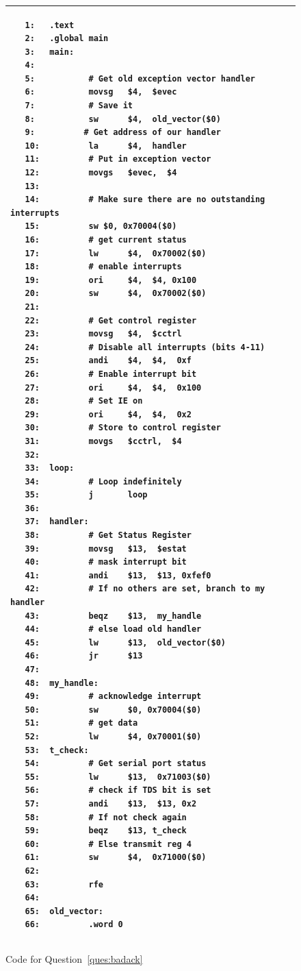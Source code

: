 \documentclass[a4paper,10pt]{article}
\begin{document}
\begin{enumerate}
\begin{figure}[p]
\begin{footnotesize}
\begin{center}
\begin{tabular}{|p{12cm}|}
\hline
\begin{verbatim}
   1:   .text
   2:   .global main
   3:   main:
   4:   
   5:           # Get old exception vector handler
   6:           movsg   $4,  $evec
   7:           # Save it
   8:           sw      $4,  old_vector($0)
   9:          # Get address of our handler
   10:          la      $4,  handler
   11:          # Put in exception vector
   12:          movgs   $evec,  $4
   13:  
   14:          # Make sure there are no outstanding interrupts
   15:          sw $0, 0x70004($0)
   16:          # get current status
   17:          lw      $4,  0x70002($0)
   18:          # enable interrupts
   19:          ori     $4,  $4, 0x100
   20:          sw      $4,  0x70002($0)
   21:  
   22:          # Get control register
   23:          movsg   $4,  $cctrl
   24:          # Disable all interrupts (bits 4-11)
   25:          andi    $4,  $4,  0xf
   26:          # Enable interrupt bit
   27:          ori     $4,  $4,  0x100
   28:          # Set IE on
   29:          ori     $4,  $4,  0x2
   30:          # Store to control register
   31:          movgs   $cctrl,  $4
   32:  
   33:  loop:
   34:          # Loop indefinitely
   35:          j       loop
   36:  
   37:  handler:
   38:          # Get Status Register
   39:          movsg   $13,  $estat
   40:          # mask interrupt bit
   41:          andi    $13,  $13, 0xfef0
   42:          # If no others are set, branch to my handler
   43:          beqz    $13,  my_handle
   44:          # else load old handler
   45:          lw      $13,  old_vector($0)
   46:          jr      $13
   47:  
   48:  my_handle:
   49:          # acknowledge interrupt
   50:          sw      $0, 0x70004($0)
   51:          # get data
   52:          lw      $4, 0x70001($0)
   53:  t_check:
   54:          # Get serial port status
   55:          lw      $13,  0x71003($0)
   56:          # check if TDS bit is set
   57:          andi    $13,  $13, 0x2
   58:          # If not check again
   59:          beqz    $13, t_check
   60:          # Else transmit reg 4
   61:          sw      $4,  0x71000($0)
   62:  
   63:          rfe
   64:  
   65:  old_vector:
   66:          .word 0

\end{verbatim}
\\ \hline
\end{tabular}
\end{center}
\end{footnotesize}
\caption{Code for Question~\ref{ques:badack}}
\label{code:badack}
\end{figure}


\end{enumerate}
\end{document}
